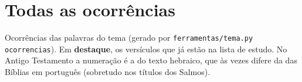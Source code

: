 \chapter{Todas as ocorrências}

Ocorrências das palavras do tema (gerado por \texttt{ferramentas/tema.py
ocorrencias}). Em \textbf{\color{destaque}destaque}, os versículos que já
estão na lista de estudo. No Antigo Testamento a numeração é a do texto
hebraico, que às vezes difere da das Bíblias em português (sobretudo nos
títulos dos Salmos).

\ocorrenciasdotema
